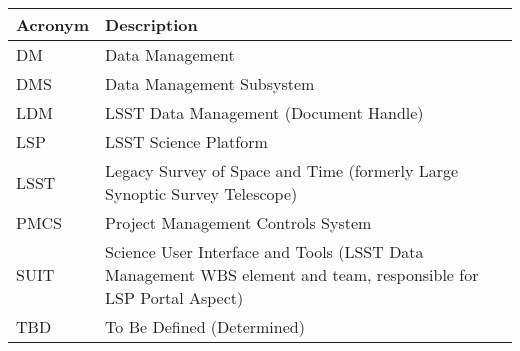 \addtocounter{table}{-1}
\begin{longtable}{p{}p{}}\hline
\textbf{Acronym} & \textbf{Description}  \\\hline

DM & Data Management \\\hline
DMS & Data Management Subsystem \\\hline
LDM & LSST Data Management (Document Handle) \\\hline
LSP & LSST Science Platform \\\hline
LSST & Legacy Survey of Space and Time (formerly Large Synoptic Survey Telescope) \\\hline
PMCS & Project Management Controls System \\\hline
SUIT & Science User Interface and Tools (LSST Data Management WBS element and team, responsible for LSP Portal Aspect) \\\hline
TBD & To Be Defined (Determined) \\\hline
\end{longtable}
